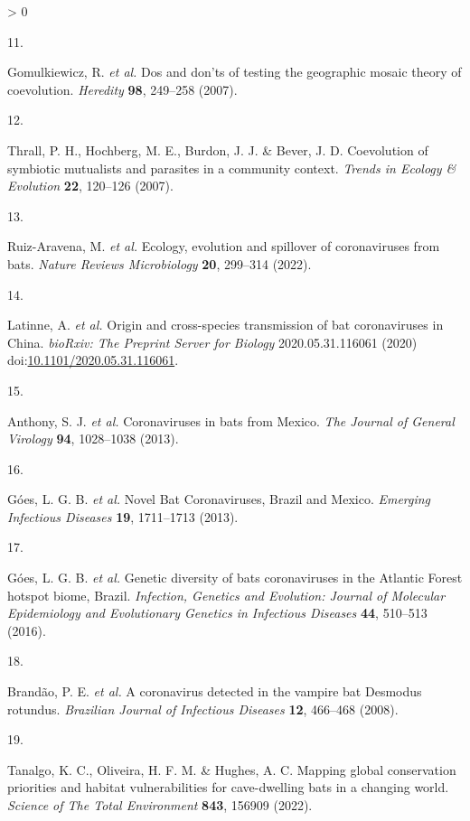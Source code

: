 \documentclass[10pt,oneside]{article}
\newlength{\cslhangindent}
\newlength{\csllabelwidth}
\newenvironment{CSLReferences}[3] %
 {%
  \setlength{\parindent}{0pt}
  \ifodd #1 \everypar{\setlength{\hangindent}{\cslhangindent}}\ignorespaces\fi
  \ifnum #2 > 0
  \setlength{\parskip}{#2\baselineskip}
  \fi
 }%
 {}
\newcommand{\CSLLeftMargin}[1]{\parbox[t]{\maxof{\widthof{#1}}{\csllabelwidth}}{#1}}
\newcommand{\CSLRightInline}[1]{\parbox[t]{\linewidth}{#1}}
\begin{document}
\begin{CSLReferences}{0}{0}
\leavevmode\hypertarget{ref-Gomulkiewicz2007Dos}{}%
\CSLLeftMargin{11. }
\CSLRightInline{Gomulkiewicz, R. \emph{et al.} Dos and don'ts of testing
the geographic mosaic theory of coevolution. \emph{Heredity}
\textbf{98}, 249--258 (2007).}

\leavevmode\hypertarget{ref-Thrall2007Coevolution}{}%
\CSLLeftMargin{12. }
\CSLRightInline{Thrall, P. H., Hochberg, M. E., Burdon, J. J. \& Bever,
J. D. Coevolution of symbiotic mutualists and parasites in a community
context. \emph{Trends in Ecology \& Evolution} \textbf{22}, 120--126
(2007).}

\leavevmode\hypertarget{ref-Ruiz-Aravena2022Ecology}{}%
\CSLLeftMargin{13. }
\CSLRightInline{Ruiz-Aravena, M. \emph{et al.} Ecology, evolution and
spillover of coronaviruses from bats. \emph{Nature Reviews Microbiology}
\textbf{20}, 299--314 (2022).}

\leavevmode\hypertarget{ref-Latinne2020Origin}{}%
\CSLLeftMargin{14. }
\CSLRightInline{Latinne, A. \emph{et al.} Origin and cross-species
transmission of bat coronaviruses in China. \emph{bioRxiv: The Preprint
Server for Biology} 2020.05.31.116061 (2020)
doi:\href{https://doi.org/10.1101/2020.05.31.116061}{10.1101/2020.05.31.116061}.}

\leavevmode\hypertarget{ref-Anthony2013Coronaviruses}{}%
\CSLLeftMargin{15. }
\CSLRightInline{Anthony, S. J. \emph{et al.} Coronaviruses in bats from
Mexico. \emph{The Journal of General Virology} \textbf{94}, 1028--1038
(2013).}

\leavevmode\hypertarget{ref-Goes2013Novel}{}%
\CSLLeftMargin{16. }
\CSLRightInline{Góes, L. G. B. \emph{et al.} Novel Bat Coronaviruses,
Brazil and Mexico. \emph{Emerging Infectious Diseases} \textbf{19},
1711--1713 (2013).}

\leavevmode\hypertarget{ref-Goes2016Genetic}{}%
\CSLLeftMargin{17. }
\CSLRightInline{Góes, L. G. B. \emph{et al.} Genetic diversity of bats
coronaviruses in the Atlantic Forest hotspot biome, Brazil.
\emph{Infection, Genetics and Evolution: Journal of Molecular
Epidemiology and Evolutionary Genetics in Infectious Diseases}
\textbf{44}, 510--513 (2016).}

\leavevmode\hypertarget{ref-Brandao2008Coronavirus}{}%
\CSLLeftMargin{18. }
\CSLRightInline{Brandão, P. E. \emph{et al.} A coronavirus detected in
the vampire bat Desmodus rotundus. \emph{Brazilian Journal of Infectious
Diseases} \textbf{12}, 466--468 (2008).}

\leavevmode\hypertarget{ref-Tanalgo2022Mapping}{}%
\CSLLeftMargin{19. }
\CSLRightInline{Tanalgo, K. C., Oliveira, H. F. M. \& Hughes, A. C.
Mapping global conservation priorities and habitat vulnerabilities for
cave-dwelling bats in a changing world. \emph{Science of The Total
Environment} \textbf{843}, 156909 (2022).}


\end{CSLReferences}
\end{document}
